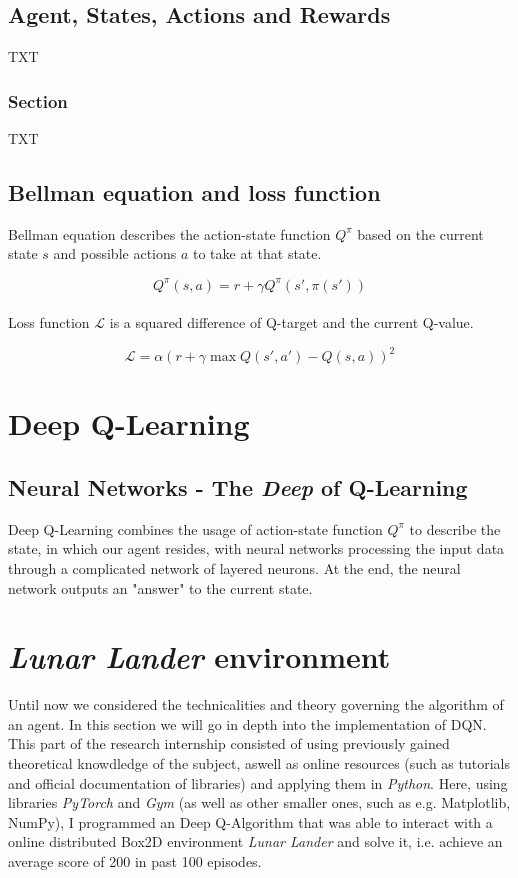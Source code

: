 \documentclass{article}
\begin{document}
\subsection{Agent, States, Actions and Rewards}
TXT
\subsubsection{Section}
TXT

\subsection{Bellman equation and loss function}
Bellman equation describes the action-state function $Q^\pi$ based on the current state $s$ and possible actions $a$ to take at that state.

\begin{equation}
\label{eqn:bellman}
Q^\pi(s,a) = r+\gamma Q^\pi(s',\pi(s'))
\end{equation}
\\
Loss function $\mathcal{L}$ is a squared difference of Q-target and the current Q-value.

\begin{equation}
\label{eqn:loss}
\mathcal{L} = \alpha(r+\gamma\max Q(s',a')-Q(s,a))^2
\end{equation}

\section{Deep Q-Learning}
\subsection{Neural Networks - The \textit{Deep} of Q-Learning}
Deep Q-Learning combines the usage of action-state function $Q^\pi$ to describe the state, in which our agent resides, with neural networks processing the input data through a complicated network of layered neurons. At the end, the neural network outputs an "answer" to the current state.

\section{\textit{Lunar Lander} environment}
Until now we considered the technicalities and theory governing the algorithm of an agent. In this section we will go in depth into the implementation of DQN. This part of the research internship consisted of using previously gained theoretical knowdledge of the subject, aswell as online resources (such as tutorials and official documentation of libraries) and applying them in \textit{Python}. Here, using libraries \textit{PyTorch} and \textit{Gym} (as well as other smaller ones, such as e.g. Matplotlib, NumPy), I programmed an Deep Q-Algorithm that was able to interact with a online distributed Box2D environment  \textit{Lunar Lander} and solve it, i.e. achieve an average score of 200 in past 100 episodes.
\end{document}

